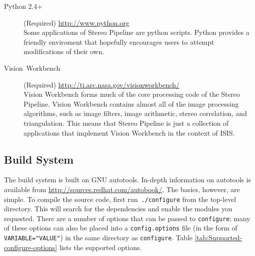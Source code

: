 \begin{description}
\item [{Python 2.4+}] (Required) \url{http://www.python.org}\\
Some applications of Stereo Pipeline are python scripts. Python
provides a friendly enviroment that hopefully encourages users to
attempt modifications of their own.

\item [{Vision~Workbench}] (Required) \url{http://ti.arc.nasa.gov/visionworkbench/}\\
Vision Workbench forms much of the core processing code of the Stereo
Pipeline. Vision Workbench contains almost all of the image processing
algorithms, such as image filters, image arithmetic, stereo
correlation, and triangulation. This means that Stereo Pipeline is
just a collection of applications that implement Vision Workbench in
the context of ISIS.

\end{description}

\subsection{Build System}

The build system is built on GNU autotools. In-depth information on
autotools is available from \url{http://sources.redhat.com/autobook/}.
The basics, however, are simple. To compile the source code, first
run~\verb#./configure# from the top-level directory. This will search
for the dependencies and enable the modules you requested. There are
a number of options that can be passed to \verb#configure#; many
of these options can also be placed into a \verb#config.options#
file (in the form of \verb#VARIABLE="VALUE"#) in the same directory
as \verb#configure#. Table \ref{tab:Supported-configure-options}
lists the supported options.

